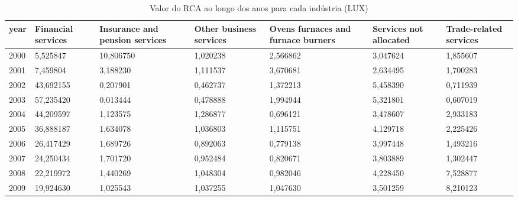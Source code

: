 \begin{table}
\centering
\caption{Valor do RCA ao longo dos anos para cada indústria (LUX)}
\begin{tabular}{p{1cm}p{2cm}p{2cm}p{2cm}p{2cm}p{2cm}p{2cm}}
\toprule
 year &  Financial services &  Insurance and pension services &  Other business services &  Ovens furnaces and furnace burners &  Services not allocated &  Trade-related services \\
\midrule
 2000 &            5,525847 &                       10,806750 &                 1,020238 &                            2,566862 &                3,047624 &                1,855607 \\
 2001 &            7,459804 &                        3,188230 &                 1,111537 &                            3,670681 &                2,634495 &                1,700283 \\
 2002 &           43,692155 &                        0,207901 &                 0,462737 &                            1,372213 &                5,458390 &                0,711939 \\
 2003 &           57,235420 &                        0,013444 &                 0,478888 &                            1,994944 &                5,321801 &                0,607019 \\
 2004 &           44,209597 &                        1,123575 &                 1,286877 &                            0,696121 &                3,478607 &                2,933183 \\
 2005 &           36,888187 &                        1,634078 &                 1,036803 &                            1,115751 &                4,129718 &                2,225426 \\
 2006 &           26,417429 &                        1,689726 &                 0,892063 &                            0,779138 &                3,997448 &                1,493216 \\
 2007 &           24,250434 &                        1,701720 &                 0,952484 &                            0,820671 &                3,803889 &                1,302447 \\
 2008 &           22,219972 &                        1,440269 &                 1,048304 &                            0,982046 &                4,228450 &                7,528877 \\
 2009 &           19,924630 &                        1,025543 &                 1,037255 &                            1,047630 &                3,501259 &                8,210123 \\

\end{tabular}
\end{table}
